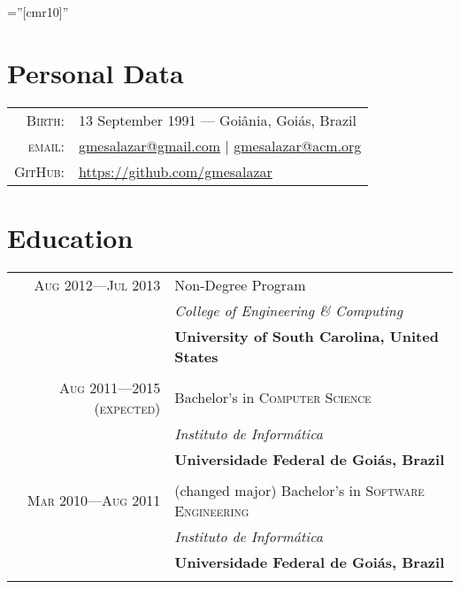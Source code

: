 \documentclass[a4paper,10pt]{article}
\begin{document}
\font\fb=''[cmr10]''

\par{\bigskip\par\vspace{8ex}}

\section{Personal Data}

\begin{tabular}{r p{3.5in}}
  \textsc{Birth:} & 13 September 1991 \hspace{0.5em}---\hspace{0.5em} Goiânia, Goiás, Brazil\\
  \textsc{email:}     & \href{mailto:gmesalazar@gmail.com}{gmesalazar@gmail.com} | \href{mailto:gmesalazar@acm.org}{gmesalazar@acm.org}\\
  \textsc{GitHub:} & \href{https://github.com/gmesalazar/}{https://github.com/gmesalazar}\\
\end{tabular}

\section{Education}
\begin{tabular}{r|p{11cm}}

  \textsc{Aug 2012---Jul 2013} & Non-Degree Program\\ &
  \emph{College of Engineering \& Computing}\\ &
  \textbf{University of South Carolina, United States}
  \\\multicolumn{2}{c}{} \\

  \textsc{Aug 2011---2015 (expected)} & Bachelor's in \textsc{Computer Science}\\ &
  \emph{Instituto de Informática}\\ &
  \textbf{Universidade Federal de Goiás, Brazil}
  \\\multicolumn{2}{c}{} \\

  \textsc{Mar 2010---Aug 2011} & (changed major) Bachelor's in \textsc{Software Engineering}\\ &
  \emph{Instituto de Informática}\\ &
  \textbf{Universidade Federal de Goiás, Brazil}
  \\\multicolumn{2}{c}{} \\

\end{tabular}
\end{document}
